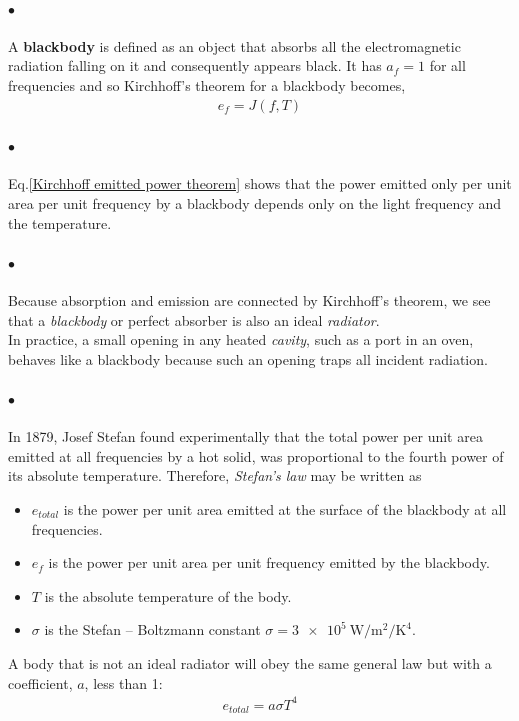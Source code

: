     \paragraph{$\bullet$} A \textbf{blackbody} is defined as an object that absorbs all the electromagnetic 
    radiation falling on it and consequently appears black. It has $a_f=1$ for all frequencies 
    and so Kirchhoff’s theorem for a blackbody becomes,
    \begin{align} \label{kirchhoff theorm blackbody}
        e_f=J(f, T)
    \end{align}

    \paragraph{$\bullet$} Eq.\eqref{Kirchhoff emitted power theorem} shows that the power emitted only
    per unit area per unit frequency by a blackbody depends only on the light frequency and the 
    temperature.

    \paragraph{$\bullet$} Because absorption and emission are connected by Kirchhoff’s theorem, 
    we see that a \textit{blackbody} or perfect absorber is also an ideal \textit{radiator}.\\
    In practice, a small opening in any heated \textit{cavity}, such as a port in an oven, behaves 
    like a blackbody because such an opening traps all incident radiation.

    \paragraph{$\bullet$} In 1879, Josef Stefan found experimentally that the total power per unit 
    area emitted at all frequencies by a hot solid, was proportional to the fourth 
    power of its absolute temperature. Therefore, \textit{Stefan’s law} may be written as
    {\tiny \begin{itemize}
        \item $e_{total}$ is the power per unit area emitted at the surface of the blackbody at all frequencies.
        \item $e_f$ is the power per unit area per unit frequency emitted by the blackbody.
        \item $T$ is the absolute temperature of the body.
        \item $\sigma$ is the Stefan – Boltzmann constant $\sigma= \SI[per-mode=symbol]{3e5}{\W\per\m\squared\per\K\tothe{4}}$.
    \end{itemize}}
    A body that is not an ideal radiator will obey the same general law but with a 
    coefficient, $a$, less than 1: \begin{align}\label{emitted power from non-ideal body}e_{total}=a \sigma T^4\end{align}

